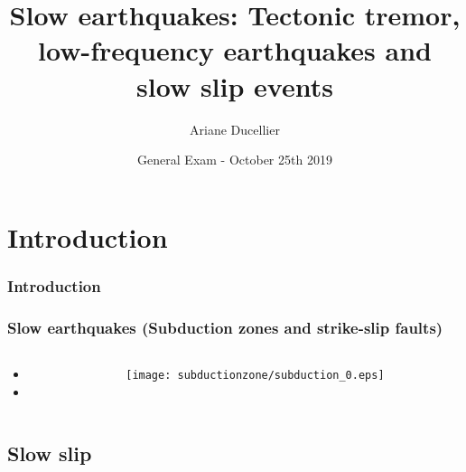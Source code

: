 \documentclass{beamer}
\title[Slow earthquakes]{Slow earthquakes: Tectonic tremor, low-frequency earthquakes and slow slip events}
\author{Ariane Ducellier}
\institute{University of Washington}
\date{General Exam - October 25th 2019}
\begin{document}
	\begin{frame}
		\titlepage
	\end{frame}


	\section{Introduction}

	\begin{frame}
		\frametitle{Introduction}
	\end{frame}

	\begin{frame}
		\frametitle{Slow earthquakes (Subduction zones and strike-slip faults)}
		\begin{columns}[c]
			\begin{column}{4cm}
				\begin{itemize}
					\item \color{green}{Short duration (minutes), long recurrence time (hundreds of years)}

					\vspace{1em}

					\item \color{red}{Long duration (a few days to several years), short recurrence time (months to years)}
				\end{itemize}
			\end{column}
			\begin{column}{8cm}
				\begin{center}
				\texttt{[image: subductionzone/subduction\_0.eps]}
			\end{center}
			\end{column}
		\end{columns}
	\end{frame}


	\subsection{Slow slip}
\end{document}
